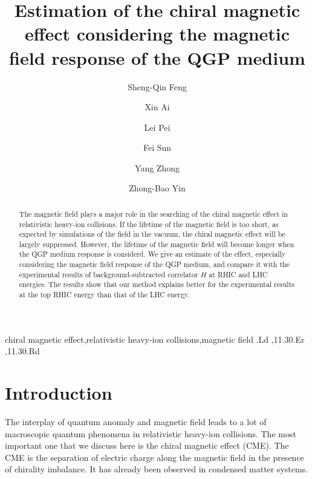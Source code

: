 \documentclass[preprint]{elsarticle}
\begin{document}
\begin{frontmatter}

\title{Estimation of the chiral magnetic effect considering the magnetic field response of the QGP medium}

\author[ctgu,moe,wuhan]{Sheng-Qin Feng}

\author[ctgu]{Xin Ai}

\author[ctgu]{Lei Pei}

\author[ctgu]{Fei Sun}

\author[ctgu]{Yang Zhong}

\author[moe]{Zhong-Bao Yin}

\address[ctgu]{College of Science, China Three Gorges University, Yichang 443002, China}
\address[moe]{Key Laboratory of Quark and Lepton Physics (MOE) and Institute of Particle Physics,\\
Central China Normal University, Wuhan 430079, China}
\address[wuhan]{School of Physics and Technology, Wuhan University, Wuhan 430072, China}

\begin{abstract}
The magnetic field plays a major role in the searching of the chiral magnetic effect in relativistic heavy-ion collisions. If the lifetime of the magnetic field is too short, as expected by simulations of the field in the vacuum, the chiral magnetic effect will be largely suppressed. However, the lifetime of the magnetic field will become longer when the QGP medium response is considerd. We give an estimate of the effect, especially considering the magnetic field response of the QGP medium, and compare it with the experimental results of background-subtracted correlator $H$ at RHIC and LHC energies. The results show that our method explains better for the experimental results at the top  RHIC energy than that of the LHC energy.
\end{abstract}

\begin{keyword}
chiral magnetic effect\sep relativistic heavy-ion collisions\sep magnetic field
.Ld \sep 11.30.Er \sep 11.30.Rd
\end{keyword}

\end{frontmatter}


\section{Introduction}\label{intro}
The interplay of quantum anomaly and magnetic field leads to a lot of macroscopic quantum phenomena in relativistic heavy-ion collisions. The most important one that we discuss here is the chiral magnetic effect (CME). The CME is the separation of electric charge along the magnetic field in the presence of chirality imbalance\cite{Kharzeev:2007jp,Warringa:2008kv,Fukushima:2008xe}. It has already been observed in condensed matter systems\cite{Li:2014bha}.
\end{document}
